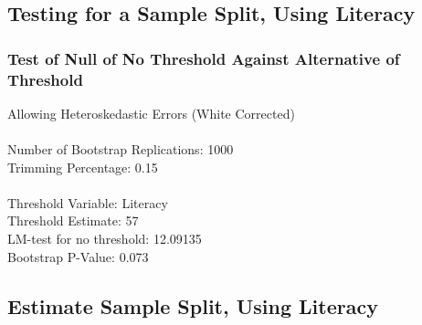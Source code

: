 \subsection{Testing for a Sample Split, Using Literacy} 
\subsubsection*{Test of Null of No Threshold Against Alternative of Threshold} 
Allowing Heteroskedastic Errors (White Corrected) \\\\
Number of Bootstrap Replications:  1000 \\
Trimming Percentage:               0.15 \\\\
Threshold Variable:                 Literacy \\
Threshold Estimate:                57 \\
LM-test for no threshold:          12.09135 \\
Bootstrap P-Value:                 0.073 \\

\subsection{Estimate Sample Split, Using Literacy} 

